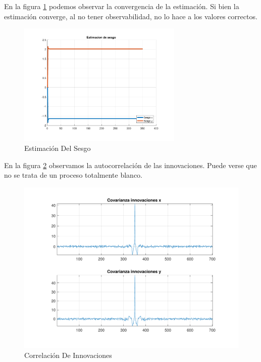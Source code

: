 	En la figura \ref{fig:ej4e_bias} podemos observar la convergencia de la estimación. Si bien la estimación converge, al no tener observabilidad, no lo hace a los valores correctos.
	
	\begin{figure}[H]
		\centering
		\includegraphics[width=0.7\textwidth,keepaspectratio]{Figuras/bias_ej4e.pdf}
		\caption{Estimación Del Sesgo}
		\label{fig:ej4e_bias}
	\end{figure}
	
	En la figura \ref{fig:ej4e_cov} observamos la autocorrelación de las innovaciones. Puede verse que no se trata de un proceso totalmente blanco.
	
	\begin{figure}[H]
		\centering
		\includegraphics[width=1.0\textwidth,keepaspectratio]{Figuras/covinn_ej4e.pdf}
		\caption{Correlación De Innovaciones}
		\label{fig:ej4e_cov}
	\end{figure}

